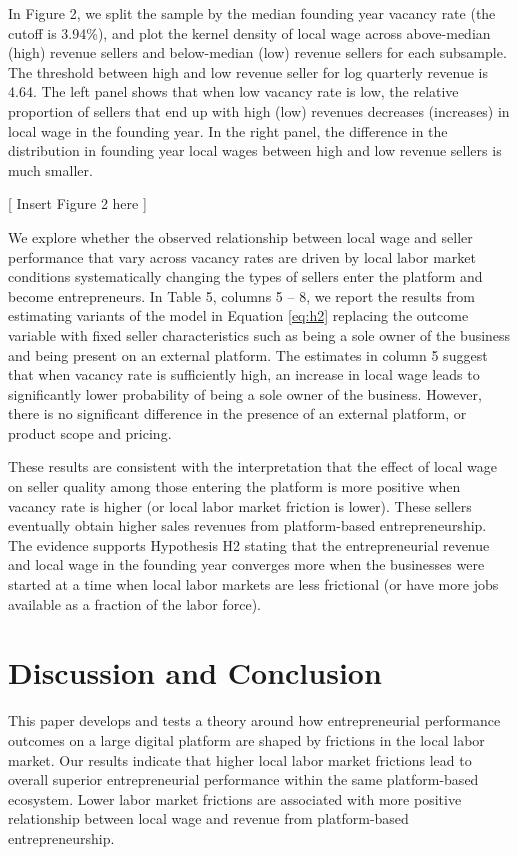 \documentclass[letterpaper,12pt]{article}
\begin{document}
In Figure 2, we split the sample by the median founding year vacancy rate (the cutoff is 3.94\%), and plot the kernel density of local wage across above-median (high) revenue sellers and below-median (low) revenue sellers for each subsample. The threshold between high and low revenue seller for log quarterly revenue is 4.64. The left panel shows that when low vacancy rate is low, the relative proportion of sellers that end up with high (low) revenues decreases (increases) in local wage in the founding year. In the right panel, the difference in the distribution in founding year local wages between high and low revenue sellers is much smaller. 

\begin{center}
[ Insert Figure 2 here ]
\end{center}

We explore whether the observed relationship between local wage and seller performance that vary across vacancy rates are driven by local labor market conditions systematically changing the types of sellers enter the platform and become entrepreneurs. In Table 5, columns 5 -- 8, we report the results from estimating variants of the model in Equation \ref{eq:h2} replacing the outcome variable with fixed seller characteristics such as being a sole owner of the business and being present on an external platform. The estimates in column 5 suggest that when vacancy rate is sufficiently high, an increase in local wage leads to significantly lower probability of being a sole owner of the business. However, there is no significant difference in the presence of an external platform, or product scope and pricing. 

These results are consistent with the interpretation that the effect of local wage on seller quality among those entering the platform is more positive when vacancy rate is higher (or local labor market friction is lower). These sellers eventually obtain higher sales revenues from platform-based entrepreneurship. The evidence supports Hypothesis H2 stating that the entrepreneurial revenue and local wage in the founding year converges more when the businesses were started at a time when local labor markets are less frictional (or have more jobs available as a fraction of the labor force).


\section{Discussion and Conclusion}
This paper develops and tests a theory around how entrepreneurial performance outcomes on a large digital platform are shaped by frictions in the local labor market. Our results indicate that higher local labor market frictions lead to overall superior entrepreneurial performance within the same platform-based ecosystem. Lower labor market frictions are associated with more positive relationship between local wage and revenue from platform-based entrepreneurship. 
\end{document}
